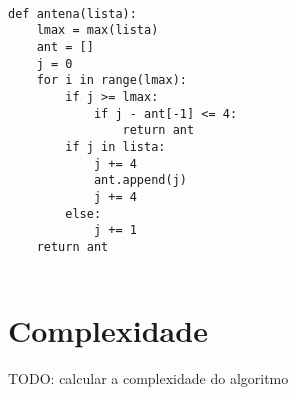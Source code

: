 \documentclass[11pt]{article}
\begin{document}
\label{sec-3-3}



\begin{verbatim}

def antena(lista):
    lmax = max(lista)
    ant = []
    j = 0
    for i in range(lmax):
        if j >= lmax:
            if j - ant[-1] <= 4:
                return ant
        if j in lista:
            j += 4
            ant.append(j)
            j += 4
        else:
            j += 1
    return ant
 
\end{verbatim}



\section{Complexidade}
\label{sec-5}

TODO: calcular a complexidade do algoritmo
\end{document}
